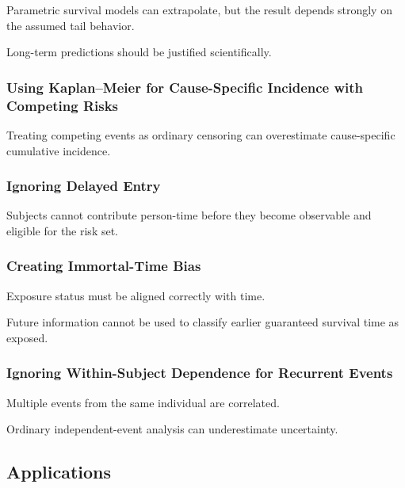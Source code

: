 Parametric survival models can extrapolate, but the result depends
strongly on the assumed tail behavior.

Long-term predictions should be justified scientifically.

\subsubsection{Using Kaplan--Meier for Cause-Specific Incidence with Competing Risks}

Treating competing events as ordinary censoring can overestimate
cause-specific cumulative incidence.

\subsubsection{Ignoring Delayed Entry}

Subjects cannot contribute person-time before they become observable and
eligible for the risk set.

\subsubsection{Creating Immortal-Time Bias}

Exposure status must be aligned correctly with time.

Future information cannot be used to classify earlier guaranteed
survival time as exposed.

\subsubsection{Ignoring Within-Subject Dependence for Recurrent Events}

Multiple events from the same individual are correlated.

Ordinary independent-event analysis can underestimate uncertainty.

\subsection{Applications}
\label{subsec:survival-applications}

